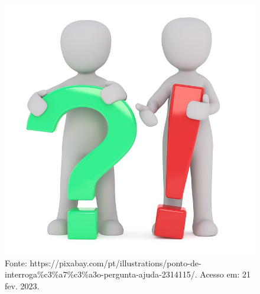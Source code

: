 \begin{figure}[htpb!]
\includegraphics[width=.5\textwidth]{./imgs/img7.jpg}
\caption{Fonte: https://pixabay.com/pt/illustrations/ponto-de-interroga\%c3\%a7\%c3\%a3o-pergunta-ajuda-2314115/. Acesso em: 21 fev. 2023.}
\end{figure}

